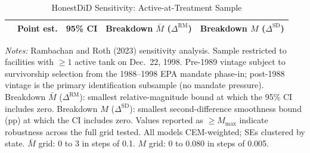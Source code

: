\begin{table}[htbp]\centering
\caption{HonestDiD Sensitivity: Active-at-Treatment Sample}
\label{tbl:sa_honestdid_active}
\begin{tabular}{lcccc}\toprule
 & Point est. & 95\% CI & Breakdown $\bar{M}$ ($\Delta^{\mathrm{RM}}$) & Breakdown $M$ ($\Delta^{\mathrm{SD}}$) \\
\midrule
\bottomrule\end{tabular}
\par\raggedright
\textit{Notes:} Rambachan and Roth (2023) sensitivity analysis. Sample restricted to facilities with $\geq 1$ active tank on Dec.\ 22, 1998. Pre-1989 vintage subject to survivorship selection from the 1988--1998 EPA mandate phase-in; post-1988 vintage is the primary identification subsample (no mandate pressure). Breakdown $\bar{M}$ ($\Delta^{\mathrm{RM}}$): smallest relative-magnitude bound at which the 95\% CI includes zero. Breakdown $M$ ($\Delta^{\mathrm{SD}}$): smallest second-difference smoothness bound (pp) at which the CI includes zero. Values reported as $\geq M_{\max}$ indicate robustness across the full grid tested. All models CEM-weighted; SEs clustered by state. $\bar{M}$ grid: 0 to 3 in steps of 0.1. $M$ grid: 0 to 0.080 in steps of 0.005.
\end{table}
